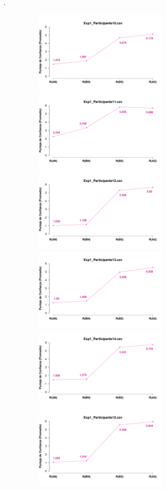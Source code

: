 \documentclass[a4paper ]{article}
\begin{document}
\vfill .
\begin{figure}[th]
\begin{center}
\includegraphics[width=8cm, height=4cm]{Figures/MirrorRating_Exp1_P10} \includegraphics[width=8cm, height=4cm]{Figures/MirrorRating_Exp1_P11} \includegraphics[width=8cm, height=4cm]{Figures/MirrorRating_Exp1_P12}
\includegraphics[width=8cm, height=4cm]{Figures/MirrorRating_Exp1_P13} \includegraphics[width=8cm, height=4cm]{Figures/MirrorRating_Exp1_P14} \includegraphics[width=8cm, height=4cm]{Figures/MirrorRating_Exp1_P15}

\end{center}
\end{figure}
\end{document}
